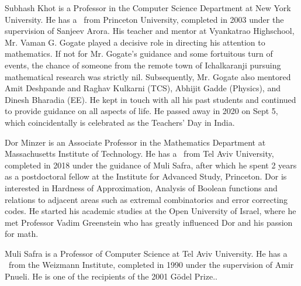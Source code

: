 \documentclass{toc}
\begin{document}
%
%
%
%
%
%
%
%
%
%
%
%
%
%
%
%
%
%
%
%
\begin{tocaboutauthors}
\begin{tocabout}[khot]  %
Subhash Khot is a Professor in the Computer Science Department at New York University. He has a \phd\ from Princeton University, completed in 2003 under the supervision of Sanjeev Arora.
His teacher and mentor at Vyankatrao Highschool, Mr. Vaman G. Gogate played a decisive role in directing his attention to mathematics. If not for Mr. Gogate’s guidance and some fortuitous turn of events, the chance of someone from the remote town of Ichalkaranji pursuing mathematical research was strictly nil. Subsequently, Mr. Gogate also mentored Amit Deshpande and Raghav Kulkarni (TCS), Abhijit Gadde (Physics), and Dinesh Bharadia (EE). He kept in touch with all his past students and continued to provide guidance on all aspects of life. He passed away in 2020 on Sept 5, which %
coincidentally  %
is celebrated as the %
Teachers' Day in India. %
\end{tocabout}
\begin{tocabout}[minzer]
Dor Minzer is an Associate Professor in the Mathematics Department at Massachusetts Institute of Technology. He has a \phd\ from Tel Aviv University, completed in 2018 under the
guidance of Muli Safra, after which he spent 2 years as a
%
postdoctoral  %
fellow at the Institute for Advanced Study, Princeton.
Dor is interested in Hardness of Approximation,
Analysis of Boolean functions and relations to adjacent areas such as extremal combinatorics and error correcting codes. He started his academic studies %
at  %
the Open University of Israel, %
where  %
he met Professor Vadim Greenstein %
who  %
has greatly influenced Dor and his passion for math.
\end{tocabout}
\begin{tocabout}[safra]
Muli Safra is a Professor of Computer Science at Tel Aviv University. He has a \phd\ from the Weizmann Institute, completed in 1990 under the supervision of Amir Pnueli. He is one of the recipients of the 2001 G\"{o}del Prize..
\end{tocabout}
\end{tocaboutauthors}
\end{document}
